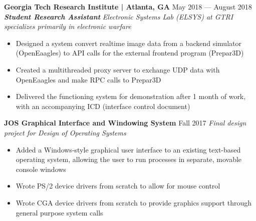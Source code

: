 \begin{samepage}
\textbf{Georgia Tech Research Institute | Atlanta, GA}
\hfill
May 2018 --- August 2018
\newline
\textbf{\textit{Student Research Assistant}}
\newline
\textit{Electronic Systems Lab (ELSYS) at GTRI specializes primarily in electronic warfare}
\begin{itemize}[noitemsep,topsep=0pt,parsep=0pt,partopsep=0pt]
    \item Designed a system convert realtime image data from a backend simulator (OpenEaagles) to API calls for the external frontend program (Prepar3D)
    \item Created a multithreaded proxy server to exchange UDP data with OpenEaagles and make RPC calls to Prepar3D
    \item Delivered the functioning system for demonstration after 1 month of work, with an accompanying ICD (interface control document)
\end{itemize}
\end{samepage}
\smallskip


\begin{samepage}
\textbf{JOS Graphical Interface and Windowing System}
\hfill
Fall 2017
\newline
\textit{Final design project for Design of Operating Systems}
\begin{itemize}[noitemsep,topsep=0pt,parsep=0pt,partopsep=0pt]
    \item Added a Windows-style graphical user interface to an existing text-based operating system, allowing the user to run processes in separate, movable console windows
    \item Wrote PS/2 device drivers from scratch to allow for mouse control
    \item Wrote CGA device drivers from scratch to provide graphics support through general purpose system calls
\end{itemize}
\end{samepage}
\smallskip
